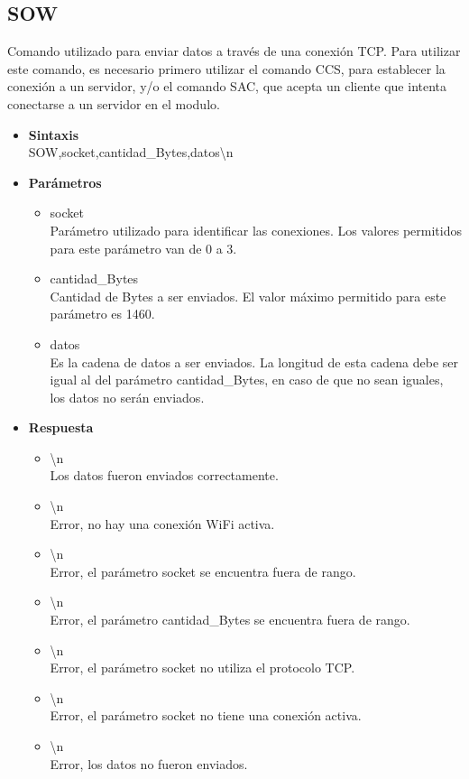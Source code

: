 \documentclass[a4paper,spanish]{article}
\begin{document}
\subsection{SOW}
Comando utilizado para enviar datos a través de una conexión TCP. Para utilizar este comando, es necesario primero utilizar el comando CCS, para establecer la conexión a un servidor, y/o el comando SAC, que acepta un cliente que intenta conectarse a un servidor en el modulo.  
\begin{itemize}
	\item \textbf{Sintaxis}\\
	{\ttfamily SOW,socket,cantidad\_Bytes,datos\textbackslash n}
	\item \textbf{Parámetros}
	\begin{itemize}
		\item{\ttfamily socket}\\
		Parámetro utilizado para identificar las conexiones. Los valores permitidos para este parámetro van de 0 a 3.
		\item{\ttfamily cantidad\_Bytes}\\
		Cantidad de Bytes a ser enviados. El valor máximo permitido para este parámetro es 1460.
		\item{\ttfamily datos}\\
		Es la cadena de datos a ser enviados. La longitud de esta cadena debe ser igual al del parámetro {\ttfamily cantidad\_Bytes}, en caso de que no sean iguales, los datos no serán enviados.
	\end{itemize}
	\item \textbf{Respuesta}
	\begin{itemize}
		\item{\textbackslash n} \\
		Los datos fueron enviados correctamente. 
		\item{\textbackslash n} \\
		Error, no hay una conexión WiFi activa.	
		\item{\textbackslash n} \\
		Error, el parámetro {\ttfamily socket} se encuentra fuera de rango.
		\item{\textbackslash n} \\
		Error, el parámetro {\ttfamily cantidad\_Bytes} se encuentra fuera de rango.
		\item{\textbackslash n} \\
		Error, el parámetro {\ttfamily socket} no utiliza el protocolo TCP.
		\item{\textbackslash n} \\
		Error, el parámetro {\ttfamily socket} no tiene una conexión activa.
		\item{\textbackslash n} \\
		Error, los datos no fueron enviados.
	\end{itemize}
\end{itemize}
\end{document}
